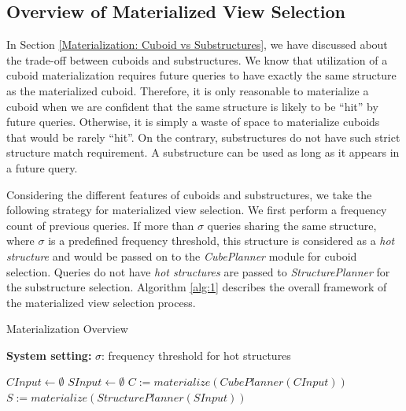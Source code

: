 \subsection{Overview of Materialized View Selection}
\label{Overview of Materialization Part}
In Section \ref{Materialization: Cuboid vs Substructures}, we have discussed about the trade-off between cuboids and substructures. We know that utilization of a cuboid materialization requires future queries to have exactly the same structure as the materialized cuboid. Therefore, it is only reasonable to materialize a cuboid %
when we are confident that the same structure is likely to be ``hit'' by future queries. Otherwise, it is simply a waste of space to materialize cuboids that would be rarely ``hit''. On the contrary, substructures do not have such strict structure match requirement. A substructure can be used as long as it appears in a future query. 

Considering the different features of cuboids and substructures, we take the following strategy for materialized view selection. 
We first perform a frequency count of previous queries. If more than $\sigma$ queries sharing the same structure, where $\sigma$ is a predefined frequency threshold, this structure is considered as a \emph{hot structure} and would be passed on to the \emph{CubePlanner} module for cuboid selection. Queries do not have \emph{hot structures} are passed to \emph{StructurePlanner} for the substructure selection. Algorithm \ref{alg:1} describes the overall framework of the materialized view selection process. 

\begin{algorithm}[H]
	\label{alg:1}
	\caption{Materialization Overview}
	\LinesNumbered
	\textbf{System setting:} $\sigma$: frequency threshold for hot structures\\ 
	
	$CInput \gets \emptyset$\;
	$SInput \gets \emptyset$\;
	$C:=materialize(CubePlanner(CInput))$\;
	$S:=materialize(StructurePlanner(SInput))$\;
	\label{alg:PartialMaterialization}
\end{algorithm}

